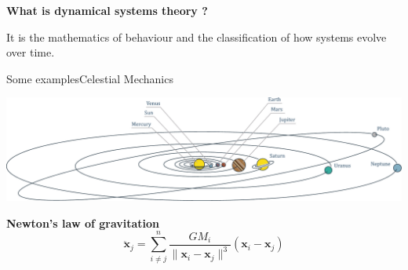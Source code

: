 \documentclass[usenames,dvipsnames,svgnames,10pt,aspectratio=169]{beamer}
\begin{document}
\begin{frame}[t, c]{}{}
  \begin{block}{\centering \textbf{What is dynamical systems theory ?}}

    \bigskip

    \centering
    It is the mathematics of behaviour and the classification of how systems evolve over time.
  \end{block}
\end{frame}

\begin{frame}[t, c]{Some examples}{Celestial Mechanics}
  \begin{minipage}{.58\textwidth}
    \centering
    \includegraphics[width=\textwidth]{solar_system}
  \end{minipage}%
  \hfill
  \begin{minipage}{.38\textwidth}
    \centering
    \textbf{Newton's law of gravitation}
    \[
    \ddot{\bm{x}}_j = \sum_{i \neq j}^n \dfrac{G M_i}{\| \bm{x}_i - \bm{x}_j \|^3} \left( \bm{x}_i - \bm{x}_j \right)
    \]
  \end{minipage}

  \vspace{1cm}
\end{frame}
\end{document}
